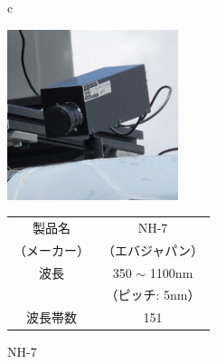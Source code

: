 \begin{figure}[b]
	\begin{center}
		\begin{tabular}{c}

			\begin{minipage}[b]{0.5\linewidth}
			\hspace{1cm}\includegraphics[width=5cm]{./Ch3_SoilTypeDiscrimination/Fig/hyperspectral_camera.jpg}
			\caption{NH-7}\label{fig:hyperspectral_camera}
			\vspace{1.5cm}
			\end{minipage}

			\hfill

			\begin{minipage}[b]{0.5\linewidth}
			\vspace{-2cm} %
			\label{tbl:hyperspectral_camera}
			
				\begin{center}
					\begin{tabular}{|c|c|} \hline
					製品名 & NH-7 \\ 
					（メーカー）& （エバジャパン）\\ \hline
					波長 & 350 $\sim$ 1100nm \\ 
					　　 &（ピッチ: 5nm）\\ \hline
					波長帯数 & 151 \\ \hline
					\end{tabular}
				\end{center}
			\vspace{3cm}
			\end{minipage}

		\end{tabular}
	\end{center}
\end{figure}

